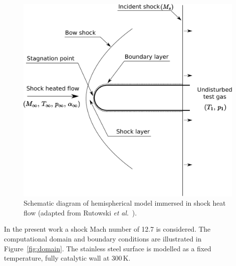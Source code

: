 \begin{figure}
 \centering
 \includegraphics[scale=0.5]{../2D/Rutowski-hemisphere/figures/schematic.pdf}
 \caption{Schematic diagram of hemispherical model immersed in shock heat flow (adapted from Rutowski \textit{et al.}~\cite{RB64}).}
  \label{fig:schematic}
\end{figure}

In the present work a shock Mach number of 12.7 is considered.
The computational domain and boundary conditions are illustrated in Figure~\ref{fig:domain}.
The stainless steel surface is modelled as a fixed temperature, fully catalytic wall at 300\,K.


